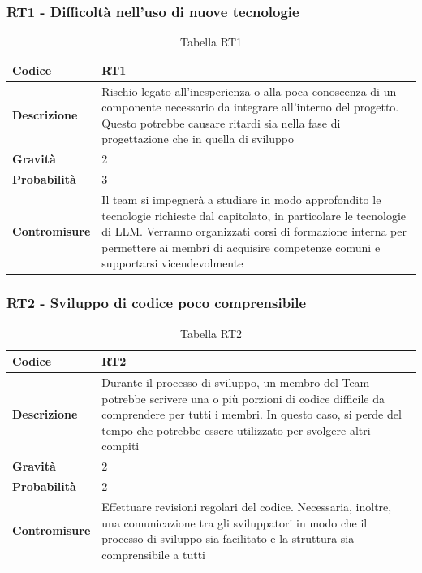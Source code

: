 \documentclass{article}
\begin{document}
    \subsubsection{RT1 - Difficoltà	 nell’uso	di nuove tecnologie}
    \begin{table}[h]
        \renewcommand{\arraystretch}{1.5}
        \centering
        \begin{tabular}{|p{3cm}|p{11cm}|}
            \hline
            \textbf{Codice} & RT1 \\
            \hline
            \textbf{Descrizione} & Rischio legato all’inesperienza o alla poca conoscenza di un componente necessario da integrare all’interno del progetto. Questo potrebbe causare ritardi sia nella fase di progettazione che in quella di sviluppo \\
            \hline
            \textbf{Gravità} & 2 \\
            \hline
            \textbf{Probabilità} & 3 \\
            \hline
            \textbf{Contromisure} & Il team si impegnerà a studiare in modo approfondito le tecnologie richieste dal capitolato, in particolare le tecnologie di LLM. Verranno organizzati corsi di formazione interna per permettere ai membri di acquisire competenze comuni e supportarsi vicendevolmente \\
            \hline
        \end{tabular}
        \caption{Tabella RT1}
    \end{table}

    \subsubsection{RT2 - Sviluppo di codice poco comprensibile}
    \begin{table}[h]
        \renewcommand{\arraystretch}{1.5}
        \centering
        \begin{tabular}{|p{3cm}|p{11cm}|}
            \hline
            \textbf{Codice} & RT2 \\
            \hline
            \textbf{Descrizione} & Durante il processo di sviluppo, un membro del Team potrebbe scrivere una o più porzioni di codice difficile da comprendere per tutti i membri. In questo caso, si perde del tempo che potrebbe essere utilizzato per svolgere altri compiti \\
            \hline
            \textbf{Gravità} & 2 \\
            \hline
            \textbf{Probabilità} & 2 \\
            \hline
            \textbf{Contromisure} & Effettuare revisioni regolari del codice. Necessaria, inoltre, una comunicazione tra gli sviluppatori in modo che il processo di sviluppo sia facilitato e la struttura sia comprensibile a tutti \\
            \hline
        \end{tabular}
        \caption{Tabella RT2}
    \end{table}
\end{document}
